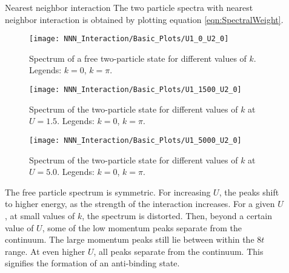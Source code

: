 \documentclass[final]{beamer}
\newlength{\sepwid}
\newlength{\onecolwid}
\begin{document}
\begin{frame}[t]
\begin{columns}[t]
\begin{column}{\onecolwid}
\begin{block}{Nearest neighbor interaction}
The two particle spectra with nearest neighbor interaction is obtained by plotting equation \eqref{eqn:SpectralWeight}.


\begin{figure}[h!]
	
\centering

\texttt{[image: NNN\_Interaction/Basic\_Plots/U1\_0\_U2\_0]}
\caption{Spectrum of a free two-particle state for different values of $k$. Legends: {\color{blue} $k = 0$}, {\color{red} $k = \pi$}.}
\label{fig:u10u20}

\end{figure}

\begin{figure}[h!]
\centering
\texttt{[image: NNN\_Interaction/Basic\_Plots/U1\_1500\_U2\_0]}
\caption{Spectrum of the two-particle state for different values of $k$ at $U = 1.5$. Legends: {\color{blue} $k = 0$}, {\color{red} $k = \pi$}.}
\label{fig:u11500u20}
\end{figure}

\begin{figure}[h!]
	\centering
	\texttt{[image: NNN\_Interaction/Basic\_Plots/U1\_5000\_U2\_0]}
	\caption{Spectrum of the two-particle state for different values of $k$ at $U = 5.0$. Legends: {\color{blue} $k = 0$}, {\color{red} $k = \pi$}.}
	\label{fig:u15000u20}
\end{figure}

The free particle spectrum is symmetric. For increasing $U$, the peaks shift to higher energy, as the strength of the interaction increases. For a given $U$, at small values of $k$, the spectrum is distorted. Then, beyond a certain value of $U$, some of the low momentum peaks separate from the continuum. The large momentum peaks still lie between within the $8t$ range. At even higher $U$, all peaks separate from the continuum. This signifies the formation of an anti-binding state.

\end{block}
\end{column}

\begin{column}{\sepwid}\end{column} %


\begin{column}{\onecolwid} %
	

\end{column}
\end{columns}
\end{frame}
\end{document}
